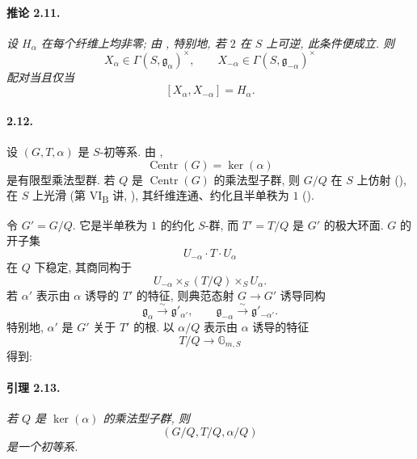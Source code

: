 \paragraph{\textbf{推论 2.11.}}
\emph{设 \(H_\alpha\) 在每个纤维上均非零; 由 \textup{}, 特别地, 若 \(2\) 在 \(S\) 上可逆, 此条件便成立. 则}
\[
  X_\alpha\in\Gamma(S,\mathfrak g_\alpha)^\times,\qquad
  X_{-\alpha}\in\Gamma(S,\mathfrak g_{-\alpha})^\times
\]
\emph{配对当且仅当}
\[
  [X_\alpha,X_{-\alpha}]=H_\alpha.
\]

\paragraph{\textbf{2.12.}}
设 \((G,T,\alpha)\) 是 \(S\)-初等系. 由 ,
\[
  \operatorname{Centr}(G)=\ker(\alpha)
\]
是有限型乘法型群. 若 \(Q\) 是 \(\operatorname{Centr}(G)\) 的乘法型子群, 则 \(G/Q\) 在 \(S\) 上仿射 \textup{()}, 在 \(S\) 上光滑 \textup{(第 VI\textsubscript{B} 讲, )}, 其纤维连通、约化且半单秩为 \(1\) \textup{()}.

令 \(G'=G/Q\). 它是半单秩为 \(1\) 的约化 \(S\)-群, 而 \(T'=T/Q\) 是 \(G'\) 的极大环面. \(G\) 的开子集
\[
  U_{-\alpha}\cdot T\cdot U_\alpha
\]
在 \(Q\) 下稳定, 其商同构于
\[
  U_{-\alpha}\times_S(T/Q)\times_S U_\alpha.
\]
若 \(\alpha'\) 表示由 \(\alpha\) 诱导的 \(T'\) 的特征, 则典范态射 \(G\to G'\) 诱导同构
\[
  \mathfrak g_\alpha\xrightarrow{\sim}\mathfrak g'_{\alpha'},
  \qquad
  \mathfrak g_{-\alpha}\xrightarrow{\sim}\mathfrak g'_{-\alpha'}.
\]
特别地, \(\alpha'\) 是 \(G'\) 关于 \(T'\) 的根. 以 \(\alpha/Q\) 表示由 \(\alpha\) 诱导的特征
\[
  T/Q\longrightarrow\mathbb G_{m,S}
\]
得到:

\paragraph{\textbf{引理 2.13.}}
\emph{若 \(Q\) 是 \(\ker(\alpha)\) 的乘法型子群, 则}
\[
  (G/Q,T/Q,\alpha/Q)
\]
\emph{是一个初等系.}

